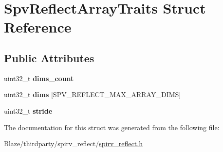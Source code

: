 \hypertarget{structSpvReflectArrayTraits}{}\section{Spv\+Reflect\+Array\+Traits Struct Reference}
\label{structSpvReflectArrayTraits}
\subsection*{Public Attributes}
\begin{DoxyCompactItemize}
\item 
\mbox{\label{structSpvReflectArrayTraits_a7c612780372a14a3ee598f706a0773af}} 
uint32\+\_\+t {\bfseries dims\+\_\+count}
\item 
\mbox{\label{structSpvReflectArrayTraits_a709b4d782b98008953cdb52193e0bb06}} 
uint32\+\_\+t {\bfseries dims} \mbox{[}S\+P\+V\+\_\+\+R\+E\+F\+L\+E\+C\+T\+\_\+\+M\+A\+X\+\_\+\+A\+R\+R\+A\+Y\+\_\+\+D\+I\+MS\mbox{]}
\item 
\mbox{\label{structSpvReflectArrayTraits_afdddf83d87f49503656c21dd2be826e1}} 
uint32\+\_\+t {\bfseries stride}
\end{DoxyCompactItemize}


The documentation for this struct was generated from the following file\+:\begin{DoxyCompactItemize}
\item 
Blaze/thirdparty/spirv\+\_\+reflect/\hyperlink{spirv__reflect_8h}{spirv\+\_\+reflect.\+h}\end{DoxyCompactItemize}
